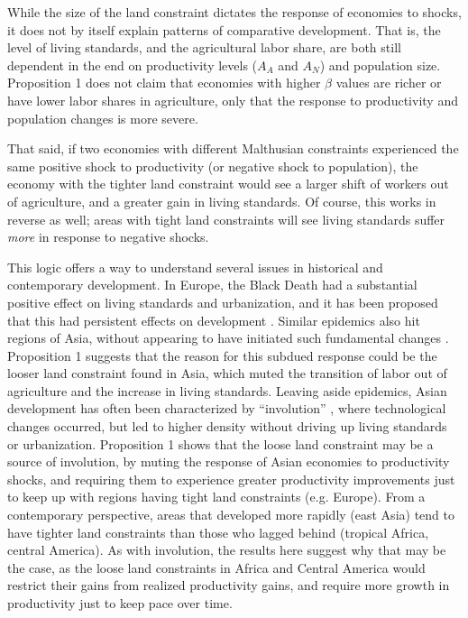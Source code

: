 \documentclass[11pt]{article}
\begin{document}
While the size of the land constraint dictates the response of economies to shocks, it does not by itself explain patterns of comparative development. That is, the level of living standards, and the agricultural labor share, are both still dependent in the end on productivity levels ($A_A$ and $A_N$) and population size. Proposition 1 does not claim that economies with higher $\beta$ values are richer or have lower labor shares in agriculture, only that the response to productivity and population changes is more severe.

That said, if two economies with different Malthusian constraints experienced the same positive shock to productivity (or negative shock to population), the economy with the tighter land constraint would see a larger shift of workers out of agriculture, and a greater gain in living standards. Of course, this works in reverse as well; areas with tight land constraints will see living standards suffer \textit{more} in response to negative shocks. 

This logic offers a way to understand several issues in historical and contemporary development. In Europe, the Black Death had a substantial positive effect on living standards and urbanization, and it has been proposed that this had persistent effects on development \citep{vv08,vv13}. Similar epidemics also hit regions of Asia, without appearing to have initiated such fundamental changes \citep{McNeill1976}. Proposition 1 suggests that the reason for this subdued response could be the looser land constraint found in Asia, which muted the transition of labor out of agriculture and the increase in living standards. Leaving aside epidemics, Asian development has often been characterized by ``involution'' \citep{Geertz1963,Huang1990,huang2002}, where technological changes occurred, but led to higher density without driving up living standards or urbanization. Proposition 1 shows that the loose land constraint may be a source of involution, by muting the response of Asian economies to productivity shocks, and requiring them to experience greater productivity improvements just to keep up with regions having tight land constraints (e.g. Europe). From a contemporary perspective, areas that developed more rapidly (east Asia) tend to have tighter land constraints than those who lagged behind (tropical Africa, central America). As with involution, the results here suggest why that may be the case, as the loose land constraints in Africa and Central America would restrict their gains from realized productivity gains, and require more growth in productivity just to keep pace over time. 
\end{document}
